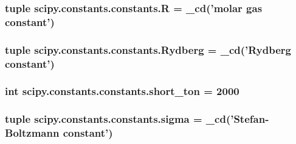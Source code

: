 \subsubsection[{R}]{\setlength{\rightskip}{0pt plus 5cm}tuple scipy.\+constants.\+constants.\+R = \+\_\+cd('molar gas constant')}\label{namespacescipy_1_1constants_1_1constants_a14a5a3abbca047b1832769674b0925af}
\hypertarget{namespacescipy_1_1constants_1_1constants_a5bad78cb9c137d905f18295a9942e96f}{}
\subsubsection[{Rydberg}]{\setlength{\rightskip}{0pt plus 5cm}tuple scipy.\+constants.\+constants.\+Rydberg = \+\_\+cd('Rydberg constant')}\label{namespacescipy_1_1constants_1_1constants_a5bad78cb9c137d905f18295a9942e96f}
\hypertarget{namespacescipy_1_1constants_1_1constants_a2efeab6ca8b5b431d9e455ce555acf5c}{}
\subsubsection[{short\+\_\+ton}]{\setlength{\rightskip}{0pt plus 5cm}int scipy.\+constants.\+constants.\+short\+\_\+ton = 2000}\label{namespacescipy_1_1constants_1_1constants_a2efeab6ca8b5b431d9e455ce555acf5c}
\hypertarget{namespacescipy_1_1constants_1_1constants_a8da67669a19f297ac21c8c45d05159b0}{}
\subsubsection[{sigma}]{\setlength{\rightskip}{0pt plus 5cm}tuple scipy.\+constants.\+constants.\+sigma = \+\_\+cd('Stefan-\/Boltzmann constant')}\label{namespacescipy_1_1constants_1_1constants_a8da67669a19f297ac21c8c45d05159b0}
\hypertarget{namespacescipy_1_1constants_1_1constants_ad444e23e8b06babd1a4a6611410c82f1}{}
